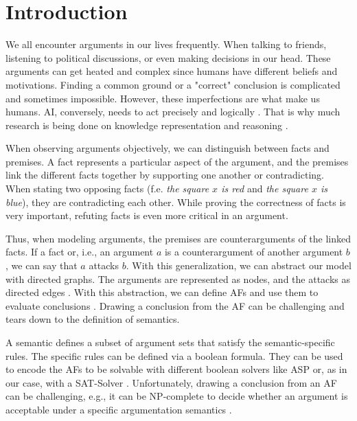 \chapter{Introduction}
We all encounter arguments in our lives frequently. When talking to friends, listening to political discussions, or even making decisions in our head. These arguments can get heated and complex since humans have different beliefs and motivations. Finding a common ground or a "correct" conclusion is complicated and sometimes impossible. However, these imperfections are what make us humans. \ac{AI}, conversely, needs to act precisely and logically \cite{DBLP:journals/frai/DietzKM24}. That is why much research is being done on knowledge representation and reasoning \cite{DBLP:journals/dagstuhl-manifestos/DelgrandeG0TW24} \cite{DBLP:journals/inffus/PopescuD23}. 

When observing arguments objectively, we can distinguish between facts and premises. A fact represents a particular aspect of the argument, and the premises link the different facts together by supporting one another or contradicting. When stating two opposing facts (f.e. \emph{the square $x$ is red} and \emph{the square $x$ is blue}), they are contradicting each other. While proving the correctness of facts is very important, refuting facts is even more critical in an argument. 

Thus, when modeling arguments, the premises are counterarguments of the linked facts. If a fact or, i.e., an argument $a$ is a counterargument of another argument $b$, we can say that $a$ attacks $b$. With this generalization, we can abstract our model with directed graphs. The arguments are represented as nodes, and the attacks as directed edges \cite{DUNG1995321}. With this abstraction, we can define \acp{AF} and use them to evaluate conclusions \cite{DBLP:conf/fapr/Geffner96}. Drawing a conclusion from the \ac{AF} can be challenging and tears down to the definition of semantics. 

A semantic defines a subset of argument sets that satisfy the semantic-specific rules. The specific rules can be defined via a boolean formula. They can be used to encode the \acp{AF} to be solvable with different boolean solvers like \ac{ASP} \cite{DBLP:journals/corr/abs-1301-1388} or, as in our case, with a \ac{SAT-Solver} \cite{DBLP:journals/amai/AmgoudD13}. Unfortunately, drawing a conclusion from an AF can be challenging, e.g., it can be NP-complete to decide whether an argument is acceptable under a specific argumentation semantics \cite{DBLP:journals/ai/DvorakGRW23}.

